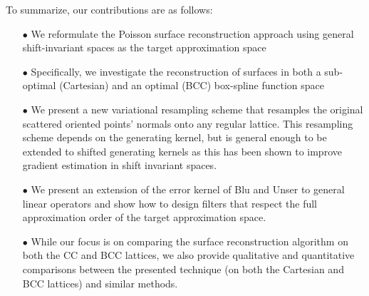 To summarize, our contributions are as follows:
\begin{itemize}
\item[$\bullet$] We reformulate the Poisson surface reconstruction approach using general shift-invariant spaces as the target approximation space
\item[$\bullet$] Specifically, we investigate the reconstruction of surfaces in both a sub-optimal (Cartesian) and an optimal (BCC)
  box-spline function space
\item[$\bullet$] We present a new variational resampling scheme that resamples the original scattered oriented points' normals onto any regular lattice. This resampling scheme depends on the generating kernel, but is general enough to be extended to shifted generating kernels as this has been shown to improve gradient estimation in shift invariant spaces. 
\item[$\bullet$] We present an extension of the error kernel of Blu and Unser to general linear operators and show how to design filters that respect the full approximation order of the target approximation space.
\item[$\bullet$] While our focus is on comparing the surface reconstruction algorithm on both the CC and BCC lattices, we also provide qualitative and quantitative comparisons between the presented technique (on both the Cartesian and BCC lattices) and similar methods. 
\end{itemize}


